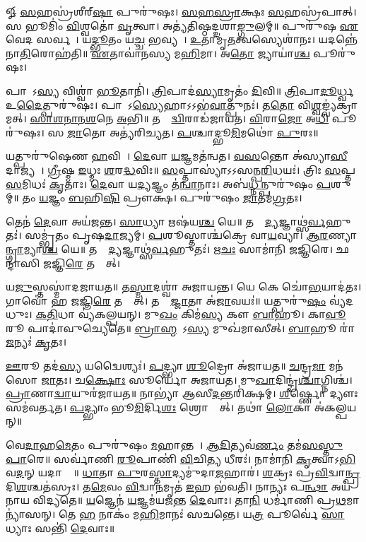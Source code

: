 𑍐 \ul{𑌸}𑌹𑌸𑍍𑌰॑𑌶𑍀𑌰𑍍‌\ul{𑌷𑌾} 𑌪𑍁𑌰𑍁॑𑌷𑌃। \ul{𑌸}\ul{𑌹}\ul{𑌸𑍍𑌰𑌾}𑌕𑍍𑌷𑌃 \ul{𑌸}𑌹𑌸𑍍𑌰॑𑌪𑌾𑌤𑍍। 𑌸 𑌭𑍂𑌮𑌿𑌂॑ \ul{𑌵𑌿}𑌶𑍍𑌵𑌤𑍋॑ \ul{𑌵𑍃}𑌤𑍍𑌵𑌾। 𑌅𑌤𑍍𑌯॑𑌤𑌿𑌷𑍍𑌠𑌦𑍍𑌦𑌶𑌾\ul{𑌙𑍍𑌗𑍁}𑌲𑌮𑍍॥ 𑌪𑍁𑌰𑍁॑𑌷 \ul{𑌏}𑌵𑍇𑌦 𑌸𑌰𑍍𑌵𑌮𑍍᳚। 𑌯\ul{𑌦𑍍𑌭𑍂}𑌤𑌂 𑌯\ul{𑌚𑍍𑌚} 𑌭𑌵𑍍𑌯𑌮𑍍᳚। \ul{𑌉}𑌤𑌾𑌮𑍃॑\ul{𑌤}𑌤𑍍𑌵𑌸𑍍𑌯𑍇𑌶𑌾॑𑌨𑌃। 𑌯𑌦𑌨𑍍𑌨𑍇॑𑌨𑌾\ul{𑌤𑌿}𑌰𑍋𑌹॑𑌤𑌿॥ \ul{𑌏}𑌤𑌾𑌵𑌾॑𑌨𑌸𑍍𑌯 𑌮\ul{𑌹𑌿}𑌮𑌾। 𑌅\ul{𑌤𑍋} 𑌜𑍍𑌯𑌾𑌯𑌾॑\ul{𑌶𑍍𑌚} 𑌪𑍂𑌰𑍁॑𑌷𑌃।

 𑌪𑌾𑌦𑍋᳚𑌽\ul{𑌸𑍍𑌯} 𑌵𑌿𑌶𑍍𑌵𑌾॑ \ul{𑌭𑍂}𑌤𑌾𑌨𑌿॑। \ul{𑌤𑍍𑌰𑌿}𑌪𑌾𑌦॑\ul{𑌸𑍍𑌯𑌾}𑌮𑍃𑌤𑌂॑ \ul{𑌦𑌿}𑌵𑌿॥ \ul{𑌤𑍍𑌰𑌿}𑌪𑌾\ul{𑌦𑍂}𑌰𑍍𑌧𑍍𑌵 𑌉\ul{𑌦𑍈}𑌤𑍍𑌪𑍁𑌰𑍁॑𑌷𑌃। 𑌪𑌾𑌦𑍋᳚𑌽\ul{𑌸𑍍𑌯𑍇}𑌹𑌾𑌽𑌽𑌭॑\ul{𑌵𑌾}𑌤𑍍𑌪𑍁𑌨𑌃॑। 𑌤\ul{𑌤𑍋} 𑌵𑌿\ul{𑌶𑍍𑌵}𑌙𑍍𑌵𑍍𑌯॑𑌕𑍍𑌰𑌾𑌮𑌤𑍍। \ul{𑌸𑌾}\ul{𑌶}\ul{𑌨𑌾}\ul{𑌨}\ul{𑌶}𑌨𑍇 \ul{𑌅}𑌭𑌿॥ 𑌤𑌸𑍍𑌮𑌾᳚\ul{𑌦𑍍𑌵𑌿}𑌰𑌾𑌡॑𑌜𑌾𑌯𑌤। \ul{𑌵𑌿}𑌰𑌾\ul{𑌜𑍋} 𑌅\ul{𑌧𑌿} 𑌪𑍂𑌰𑍁॑𑌷𑌃। 𑌸 \ul{𑌜𑌾}𑌤𑍋 𑌅𑌤𑍍𑌯॑𑌰𑌿𑌚𑍍𑌯𑌤। \ul{𑌪}𑌶𑍍𑌚𑌾𑌦𑍍𑌭𑍂\ul{𑌮𑌿}𑌮𑌥𑍋॑ \ul{𑌪𑍁}𑌰𑌃॥

 𑌯𑌤𑍍𑌪𑍁𑌰𑍁॑𑌷𑍇𑌣 \ul{𑌹}𑌵𑌿𑌷𑌾᳚। \ul{𑌦𑍇}𑌵𑌾 \ul{𑌯}𑌜𑍍𑌞𑌮𑌤॑𑌨𑍍𑌵𑌤। \ul{𑌵}\ul{𑌸}𑌨𑍍𑌤𑍋 𑌅॑𑌸𑍍𑌯𑌾\ul{𑌸𑍀}𑌦𑌾𑌜𑍍𑌯𑌮𑍍᳚। \ul{𑌗𑍍𑌰𑍀}𑌷𑍍𑌮 \ul{𑌇}𑌧𑍍𑌮𑌃 \ul{𑌶}𑌰\ul{𑌦𑍍𑌧}𑌵𑌿𑌃॥ \ul{𑌸}𑌪𑍍𑌤𑌾𑌸𑍍𑌯𑌾॑𑌽𑌽\-𑌸𑌨𑍍𑌪\ul{𑌰𑌿}𑌧𑌯𑌃॑। 𑌤𑍍𑌰𑌿𑌃 \ul{𑌸}𑌪𑍍𑌤 \ul{𑌸}𑌮𑌿𑌧𑌃॑ \ul{𑌕𑍃}𑌤𑌾𑌃। \ul{𑌦𑍇}𑌵𑌾 𑌯\ul{𑌦𑍍𑌯}𑌜𑍍𑌞𑌂 𑌤॑\ul{𑌨𑍍𑌵𑌾}𑌨𑌾𑌃। 𑌅𑌬॑\ul{𑌧𑍍𑌨}𑌨𑍍𑌪𑍁𑌰𑍁॑𑌷𑌂 \ul{𑌪}𑌶𑍁𑌮𑍍॥ 𑌤𑌂 \ul{𑌯}𑌜𑍍𑌞𑌂 \ul{𑌬}\ar 𑌹𑌿\ul{𑌷𑌿} 𑌪𑍍𑌰𑍗𑌕𑍍𑌷\sn। 𑌪𑍁𑌰𑍁॑𑌷𑌂 \ul{𑌜𑌾}𑌤𑌮॑\ul{𑌗𑍍𑌰}𑌤𑌃।

 𑌤𑍇𑌨॑ \ul{𑌦𑍇}𑌵𑌾 𑌅𑌯॑𑌜𑌨𑍍𑌤। \ul{𑌸𑌾}𑌧𑍍𑌯𑌾 𑌋𑌷॑𑌯\ul{𑌶𑍍𑌚} 𑌯𑍇॥ 𑌤𑌸𑍍𑌮𑌾᳚\ul{𑌦𑍍𑌯}𑌜𑍍𑌞𑌾𑌥𑍍𑌸॑\ul{𑌰𑍍𑌵}\-𑌹𑍁𑌤𑌃॑। 𑌸𑌮𑍍𑌭𑍃॑𑌤𑌂 𑌪𑍃𑌷\ul{𑌦𑌾}𑌜𑍍𑌯𑌮𑍍। \ul{𑌪}𑌶𑍂𑌸𑍍𑌤𑌾𑌶𑍍𑌚॑𑌕𑍍𑌰𑍇 𑌵𑌾\ul{𑌯}𑌵𑍍𑌯𑌾\sn{}। \ul{𑌆}\ul{𑌰}𑌣𑍍𑌯𑌾\ul{𑌨𑍍𑌗𑍍𑌰𑌾}𑌮𑍍𑌯𑌾\ul{𑌶𑍍𑌚} 𑌯𑍇॥ 𑌤𑌸𑍍𑌮𑌾᳚\ul{𑌦𑍍𑌯}𑌜𑍍𑌞𑌾𑌥𑍍𑌸॑\ul{𑌰𑍍𑌵}𑌹𑍁𑌤𑌃॑। 𑌋\ul{𑌚𑌃} 𑌸𑌾𑌮𑌾॑𑌨𑌿 𑌜𑌜𑍍𑌞𑌿𑌰𑍇। 𑌛𑌨𑍍𑌦𑌾॑𑌸𑌿 𑌜𑌜𑍍𑌞𑌿\ul{𑌰𑍇} 𑌤𑌸𑍍𑌮𑌾᳚𑌤𑍍।

 𑌯\ul{𑌜𑍁}𑌸𑍍𑌤𑌸𑍍𑌮𑌾॑𑌦𑌜𑌾𑌯𑌤॥ 𑌤\ul{𑌸𑍍𑌮𑌾}𑌦𑌶𑍍𑌵𑌾॑ 𑌅𑌜𑌾𑌯𑌨𑍍𑌤। 𑌯𑍇 𑌕𑍇 𑌚𑍋॑\ul{𑌭}𑌯𑌾𑌦॑𑌤𑌃। 𑌗𑌾𑌵𑍋॑ 𑌹 𑌜𑌜𑍍𑌞𑌿\ul{𑌰𑍇} 𑌤𑌸𑍍𑌮𑌾᳚𑌤𑍍। 𑌤𑌸𑍍𑌮𑌾᳚\ul{𑌜𑍍𑌜𑌾}𑌤𑌾 𑌅॑\ul{𑌜𑌾}𑌵𑌯𑌃॑॥ 𑌯𑌤𑍍𑌪𑍁𑌰𑍁॑\ul{𑌷𑌂} 𑌵𑍍𑌯॑𑌦𑌧𑍁𑌃। \ul{𑌕}\ul{𑌤𑌿}𑌧𑌾 𑌵𑍍𑌯॑𑌕𑌲𑍍𑌪𑌯𑌨𑍍। 𑌮𑍁\ul{𑌖𑌂} 𑌕𑌿𑌮॑\ul{𑌸𑍍𑌯} 𑌕𑍗 \ul{𑌬𑌾}𑌹𑍂। 𑌕𑌾\ul{𑌵𑍂}𑌰𑍂 𑌪𑌾𑌦𑌾॑𑌵𑍁𑌚𑍍𑌯𑍇𑌤𑍇॥ \ul{𑌬𑍍𑌰𑌾}\ul{𑌹𑍍𑌮}𑌣𑍋᳚𑌽\ul{𑌸𑍍𑌯} 𑌮𑍁𑌖॑𑌮𑌾𑌸𑍀𑌤𑍍। \ul{𑌬𑌾}𑌹𑍂 𑌰𑌾॑\ul{𑌜}𑌨𑍍𑌯𑌃॑ \ul{𑌕𑍃}𑌤𑌃।

 \ul{𑌊}𑌰𑍂 𑌤𑌦॑\ul{𑌸𑍍𑌯} 𑌯𑌦𑍍𑌵𑍈𑌶𑍍𑌯𑌃॑। \ul{𑌪}𑌦𑍍𑌭𑍍𑌯𑌾 \ul{𑌶𑍂}𑌦𑍍𑌰𑍋 𑌅॑𑌜𑌾𑌯𑌤॥ \ul{𑌚}𑌨𑍍𑌦𑍍𑌰\ul{𑌮𑌾} 𑌮𑌨॑𑌸𑍋 \ul{𑌜𑌾}𑌤𑌃। 𑌚\ul{𑌕𑍍𑌷𑍋𑌃} 𑌸𑍂𑌰𑍍𑌯𑍋॑ 𑌅𑌜𑌾𑌯𑌤। 𑌮𑍁\ul{𑌖𑌾}𑌦𑌿𑌨𑍍𑌦𑍍𑌰॑\ul{𑌶𑍍𑌚𑌾}𑌗𑍍𑌨𑌿𑌶𑍍𑌚॑। \ul{𑌪𑍍𑌰𑌾}𑌣𑌾\ul{𑌦𑍍𑌵𑌾}𑌯𑍁𑌰॑𑌜𑌾𑌯𑌤॥ 𑌨𑌾𑌭𑍍𑌯𑌾॑ 𑌆𑌸𑍀\ul{𑌦}𑌨𑍍𑌤𑌰𑌿॑𑌕𑍍𑌷𑌮𑍍। \ul{𑌶𑍀}𑌰𑍍𑌷𑍍𑌣𑍋 𑌦𑍍𑌯𑍗𑌃 𑌸𑌮॑𑌵𑌰𑍍𑌤𑌤। \ul{𑌪}𑌦𑍍𑌭𑍍𑌯𑌾𑌂 𑌭𑍂\ul{𑌮𑌿}𑌰𑍍𑌦𑌿\ul{𑌶𑌃} 𑌶𑍍𑌰𑍋𑌤𑍍𑌰𑌾᳚𑌤𑍍। 𑌤𑌥𑌾॑ \ul{𑌲𑍋}𑌕𑌾 𑌅॑𑌕𑌲𑍍𑌪𑌯𑌨𑍍॥

 𑌵𑍇\ul{𑌦𑌾}𑌹\ul{𑌮𑍇}𑌤𑌂 𑌪𑍁𑌰𑍁॑𑌷𑌂 \ul{𑌮}𑌹𑌾𑌨𑍍𑌤𑌮𑍍᳚। \ul{𑌆}\ul{𑌦𑌿}𑌤𑍍𑌯𑌵॑\ul{𑌰𑍍𑌣𑌂} 𑌤𑌮॑\ul{𑌸}\ul{𑌸𑍍𑌤𑍁} \ul{𑌪𑌾}𑌰𑍇॥ 𑌸𑌰𑍍𑌵𑌾॑𑌣𑌿 \ul{𑌰𑍂}𑌪𑌾𑌣𑌿॑ \ul{𑌵𑌿}𑌚𑌿\ul{𑌤𑍍𑌯} 𑌧𑍀𑌰𑌃॑। 𑌨𑌾𑌮𑌾॑𑌨𑌿 \ul{𑌕𑍃}𑌤𑍍𑌵𑌾𑌽\ul{𑌭𑌿}𑌵\ul{𑌦}𑌨𑍍 𑌯𑌦𑌾𑌸𑍍𑌤𑍇᳚॥ \ul{𑌧𑌾}𑌤𑌾 \ul{𑌪𑍁}𑌰\ul{𑌸𑍍𑌤𑌾}𑌦𑍍𑌯𑌮𑍁॑𑌦𑌾\ul{𑌜}𑌹𑌾𑌰॑। \ul{𑌶}𑌕𑍍𑌰𑌃 𑌪𑍍𑌰\ul{𑌵𑌿}𑌦𑍍𑌵𑌾\ul{𑌨𑍍𑌪𑍍𑌰}𑌦𑌿\ul{𑌶}𑌶𑍍𑌚𑌤॑𑌸𑍍𑌰𑌃। 𑌤\ul{𑌮𑍇}𑌵𑌂 \ul{𑌵𑌿}𑌦𑍍𑌵𑌾\ul{𑌨}𑌮𑍃𑌤॑ \ul{𑌇}𑌹 𑌭॑𑌵𑌤𑌿। 𑌨𑌾𑌨𑍍𑌯𑌃 𑌪\ul{𑌨𑍍𑌥𑌾} 𑌅𑌯॑𑌨𑌾𑌯 𑌵𑌿𑌦𑍍𑌯𑌤𑍇॥ \ul{𑌯}𑌜𑍍𑌞𑍇𑌨॑ \ul{𑌯}𑌜𑍍𑌞𑌮॑𑌯𑌜𑌨𑍍𑌤 \ul{𑌦𑍇}𑌵𑌾𑌃। 𑌤𑌾\ul{𑌨𑌿} 𑌧𑌰𑍍𑌮𑌾॑𑌣𑌿 𑌪𑍍𑌰\ul{𑌥}𑌮𑌾𑌨𑍍𑌯𑌾॑𑌸𑌨𑍍। 𑌤𑍇 \ul{𑌹} 𑌨𑌾𑌕𑌂॑ 𑌮\ul{𑌹𑌿}𑌮𑌾𑌨𑌃॑ 𑌸𑌚𑌨𑍍𑌤𑍇। 𑌯\ul{𑌤𑍍𑌰} 𑌪𑍂𑌰𑍍𑌵𑍇॑ \ul{𑌸𑌾}𑌧𑍍𑌯𑌾𑌃 𑌸𑌨𑍍𑌤𑌿॑ \ul{𑌦𑍇}𑌵𑌾𑌃॥ 

